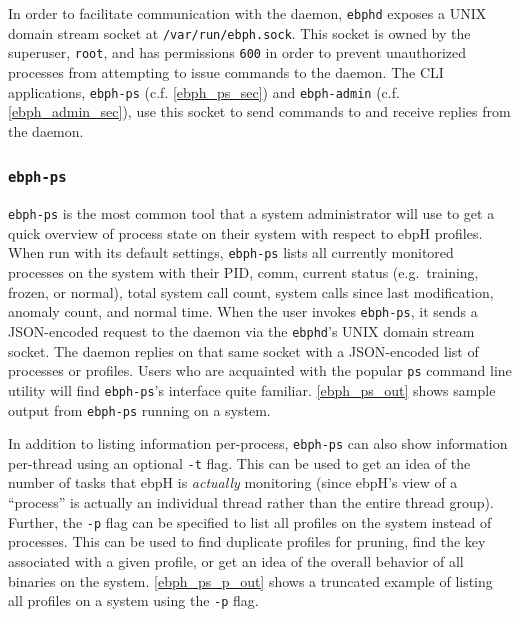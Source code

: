 \documentclass[
  12pt]{findlay}
\newcommand{\passthrough}[1]{#1}
\begin{document}
\FloatBarrier

In order to facilitate communication with the daemon,
\passthrough{\lstinline!ebphd!} exposes a UNIX domain stream socket at
\passthrough{\lstinline!/var/run/ebph.sock!}. This socket is owned by
the superuser, \passthrough{\lstinline!root!}, and has permissions
\passthrough{\lstinline!600!} in order to prevent unauthorized processes
from attempting to issue commands to the daemon. The CLI applications,
\passthrough{\lstinline!ebph-ps!} (c.f. \autoref{ebph_ps_sec}) and
\passthrough{\lstinline!ebph-admin!} (c.f. \autoref{ebph_admin_sec}),
use this socket to send commands to and receive replies from the daemon.

\hypertarget{ebph-ps}{%
\subsubsection{\texorpdfstring{\texttt{ebph-ps}}{ebph-ps}}\label{ebph-ps}}

\label{ebph_ps_sec}

\passthrough{\lstinline!ebph-ps!} is the most common tool that a system
administrator will use to get a quick overview of process state on their
system with respect to ebpH profiles. When run with its default
settings, \passthrough{\lstinline!ebph-ps!} lists all currently
monitored processes on the system with their PID, comm, current status
(e.g.~training, frozen, or normal), total system call count, system
calls since last modification, anomaly count, and normal time. When the
user invokes \passthrough{\lstinline!ebph-ps!}, it sends a JSON-encoded
request to the daemon via the \passthrough{\lstinline!ebphd!}'s UNIX
domain stream socket. The daemon replies on that same socket with a
JSON-encoded list of processes or profiles. Users who are acquainted
with the popular \passthrough{\lstinline!ps!} command line utility will
find \passthrough{\lstinline!ebph-ps!}'s interface quite familiar.
\autoref{ebph_ps_out} shows sample output from
\passthrough{\lstinline!ebph-ps!} running on a system.


In addition to listing information per-process,
\passthrough{\lstinline!ebph-ps!} can also show information per-thread
using an optional \passthrough{\lstinline!-t!} flag. This can be used to
get an idea of the number of tasks that ebpH is \emph{actually}
monitoring (since ebpH's view of a ``process'' is actually an individual
thread rather than the entire thread group). Further, the
\passthrough{\lstinline!-p!} flag can be specified to list all profiles
on the system instead of processes. This can be used to find duplicate
profiles for pruning, find the key associated with a given profile, or
get an idea of the overall behavior of all binaries on the system.
\autoref{ebph_ps_p_out} shows a truncated example of listing all
profiles on a system using the \passthrough{\lstinline!-p!} flag.
\end{document}

